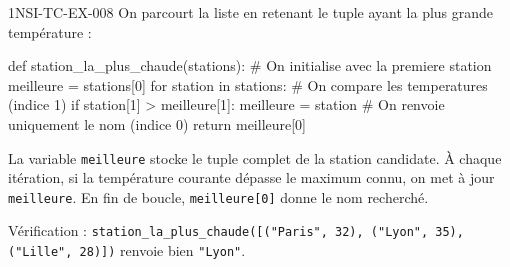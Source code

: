 \begin{corrige}{1NSI-TC-EX-008}
On parcourt la liste en retenant le tuple ayant la plus grande température :

\begin{python}
def station_la_plus_chaude(stations):
    # On initialise avec la premiere station
    meilleure = stations[0]
    for station in stations:
        # On compare les temperatures (indice 1)
        if station[1] > meilleure[1]:
            meilleure = station
    # On renvoie uniquement le nom (indice 0)
    return meilleure[0]
\end{python}

La variable \lstinline{meilleure} stocke le tuple complet de la station candidate. À chaque itération, si la température courante dépasse le maximum connu, on met à jour \lstinline{meilleure}. En fin de boucle, \lstinline{meilleure[0]} donne le nom recherché.

Vérification : \lstinline{station_la_plus_chaude([("Paris", 32), ("Lyon", 35), ("Lille", 28)])} renvoie bien \lstinline{"Lyon"}.
\end{corrige}
